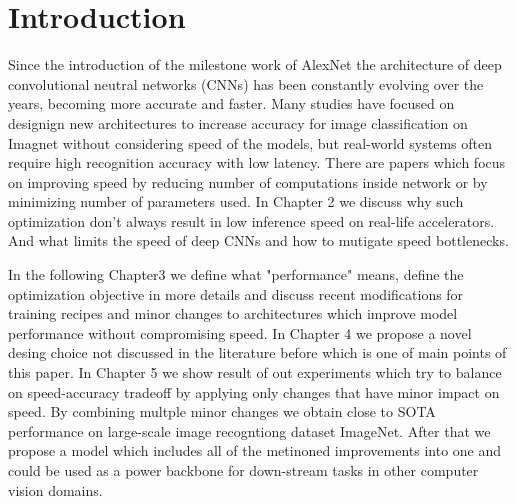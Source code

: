 

\chapter{Introduction}







Since the introduction of the milestone work of AlexNet \cite{krizhevsky2012_imagenet_alexnet} the architecture of deep convolutional neutral networks (CNNs) has been constantly evolving over the years, becoming more accurate and faster. Many studies have focused on designign new architectures to increase accuracy for image classification on Imagnet without considering speed of the models, but real-world systems often require high recognition accuracy with low latency. There are papers which focus on improving speed by reducing number of computations inside network or by minimizing number of parameters used. In Chapter 2 we discuss why such optimization don't always result in low inference speed on real-life accelerators. And what limits the speed of deep CNNs and how to mutigate speed bottlenecks.

In the following Chapter3 we define what "performance" means, define the optimization objective in more details and discuss recent modifications for training recipes and minor changes to architectures which improve model performance without compromising speed. In Chapter 4 we propose a novel desing choice not discussed in the literature before which is one of main points of this paper. In Chapter 5 we show result of out experiments which try to balance on speed-accuracy tradeoff by applying only changes that have minor impact on speed. By combining multple minor changes we obtain close to SOTA performance on large-scale image recogntiong dataset ImageNet. After that we propose a model which includes all of the metinoned improvements into one and could be used as a power backbone for down-stream tasks in other computer vision domains.

